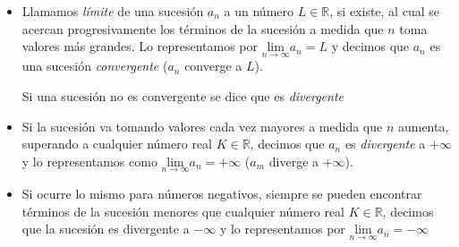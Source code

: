 \begin{definition} [ Convergencia]

\begin{itemize}
\item Llamamos \emph{límite} de una sucesión $a_n$ a un número $L \in \mathbb R$, si existe, al cual se acercan progresivamente los términos de la sucesión a medida que $n$ toma valores más grandes. Lo representamos por  $\underset{n\to \infty}{\mathrm{lim}} a_n=L$ y decimos	 que $a_n$ es una sucesión \emph{convergente} ($a_n$ converge a $L$).

Si una sucesión no es convergente se dice que es \emph{divergente}

\item Si la sucesión va tomando valores cada vez mayores a medida que $n$ aumenta, superando a cualquier número real $K\in \mathbb R$, decimos que $a_n$ es \emph{divergente} a $+\infty$ y lo representamos como $\underset{n\to \infty}{\mathrm{lim}} a_n=+\infty$ ($a_m$ diverge a $+\infty$).
\item Si ocurre lo mismo para números negativos, siempre se pueden encontrar términos de la sucesión menores que cualquier  número real $K\in \mathbb R$, decimos que la sucesión es divergente a $-\infty$ y lo representamos por $\underset{n\to \infty}{\mathrm{lim}} a_n=-\infty$
\end{itemize}
	
\end{definition}

